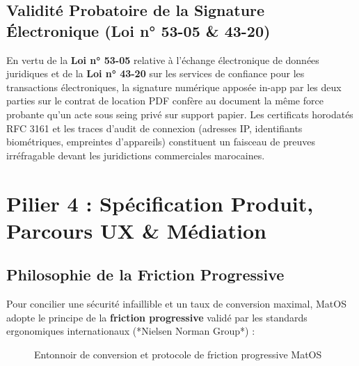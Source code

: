 \documentclass[11pt,a4paper]{report}
\begin{document}
\section{Validité Probatoire de la Signature Électronique (Loi n° 53-05 \& 43-20)}
En vertu de la \textbf{Loi n° 53-05} relative à l'échange électronique de données juridiques et de la \textbf{Loi n° 43-20} sur les services de confiance pour les transactions électroniques, la signature numérique apposée in-app par les deux parties sur le contrat de location PDF confère au document la même force probante qu'un acte sous seing privé sur support papier. Les certificats horodatés RFC 3161 et les traces d'audit de connexion (adresses IP, identifiants biométriques, empreintes d'appareils) constituent un faisceau de preuves irréfragable devant les juridictions commerciales marocaines.

\chapter{Pilier 4 : Spécification Produit, Parcours UX \& Médiation}

\section{Philosophie de la Friction Progressive}
Pour concilier une sécurité infaillible et un taux de conversion maximal, MatOS adopte le principe de la \textbf{friction progressive} validé par les standards ergonomiques internationaux (*Nielsen Norman Group*) :

\begin{figure}[h!]
\centering
{}
\caption{Entonnoir de conversion et protocole de friction progressive MatOS}
\end{figure}
\end{document}
